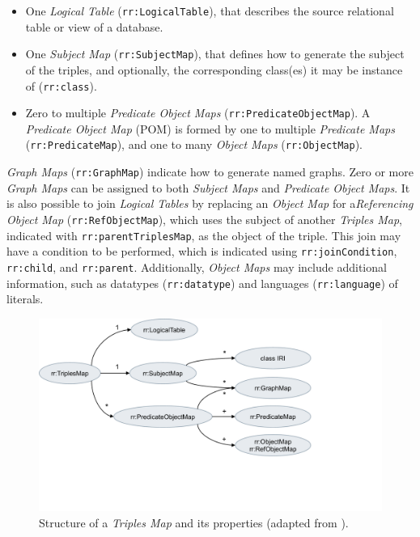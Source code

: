 \begin{itemize}
    \item One \textit{Logical Table} (\texttt{rr:LogicalTable}), that describes the source relational table or view of a database.
    \item One \textit{Subject Map} (\texttt{rr:SubjectMap}), that defines how to generate the subject of the triples, and optionally, the corresponding class(es) it may be instance of (\texttt{rr:class}).
    \item Zero to multiple \textit{Predicate Object Maps} (\texttt{rr:PredicateObjectMap}). A \textit{Predicate Object Map} (POM) is formed by one to multiple \textit{Predicate Maps} (\texttt{rr:PredicateMap}), and one to many \textit{Object Maps} (\texttt{rr:ObjectMap}).%
\end{itemize}

\textit{Graph Maps} (\texttt{rr:GraphMap}) indicate how to generate named graphs. Zero or more \textit{Graph Maps} can be assigned to both \textit{Subject Maps} and \textit{Predicate Object Maps}. 
It is also possible to join \textit{Logical Tables} by replacing an \textit{Object Map} for a\textit{Referencing Object Map} (\texttt{rr:RefObjectMap}), which uses the subject of another \textit{Triples Map}, indicated with \texttt{rr:parentTriplesMap}, as the object of the triple. 
This join may have a condition to be performed, which is indicated using \texttt{rr:joinCondition}, \texttt{rr:child}, and \texttt{rr:parent}. 
Additionally, \textit{Object Maps} may include additional information, such as datatypes (\texttt{rr:datatype}) and languages (\texttt{rr:language}) of literals. 

\begin{figure}[h]
\centering
\includegraphics[width=0.7\linewidth]{figures/chp2_r2rml_tm.pdf}
\caption[Structure of Triples Map from R2RML]{Structure of a \textit{Triples Map} and its properties (adapted from \cite{das2012r2rml}).}
\label{fig:chp2_r2rml-tm}
\end{figure}

